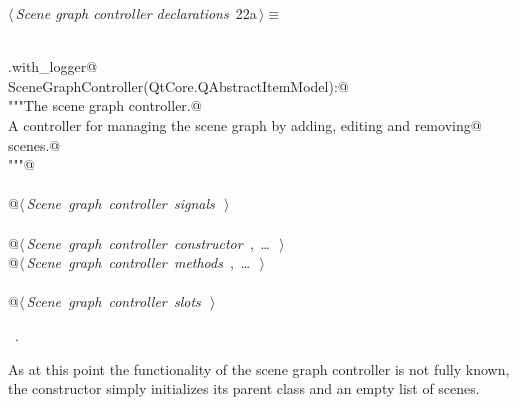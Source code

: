 \documentclass[
    a4paper,      %
    10pt,         %
    openright,    %
    notitlepage,  %
    parskip=half, %
]{scrreprt}       %
\theoremstyle{definition}                    %
\begin{document}
\begin{flushleft} \small
\begin{minipage}{\linewidth}\label{scrap16}\raggedright\small
{} $\langle\,${\itshape Scene graph controller declarations}\nobreak\ {\footnotesize {22a}}$\,\rangle\equiv$
\vspace{-1exm}
\begin{list}{}{} \item
\mbox{}\lstinline@@\\
\mbox{}\lstinline@common.with_logger@\\
\mbox{}\lstinline@class SceneGraphController(QtCore.QAbstractItemModel):@\\
\mbox{}\lstinline@    """The scene graph controller.@\\
\mbox{}\lstinline@    A controller for managing the scene graph by adding, editing and removing@\\
\mbox{}\lstinline@    scenes.@\\
\mbox{}\lstinline@    """@\\
\mbox{}\lstinline@@\\
\mbox{}\lstinline@    @\hbox{$\langle\,${\itshape Scene graph controller signals}\nobreak\ {\footnotesize {}}$\,\rangle$}\lstinline@@\\
\mbox{}\lstinline@@\\
\mbox{}\lstinline@    @\hbox{$\langle\,${\itshape Scene graph controller constructor}\nobreak\ {\footnotesize {}, \ldots\ }$\,\rangle$}\lstinline@@\\
\mbox{}\lstinline@    @\hbox{$\langle\,${\itshape Scene graph controller methods}\nobreak\ {\footnotesize {}, \ldots\ }$\,\rangle$}\lstinline@@\\
\mbox{}\lstinline@@\\
\mbox{}\lstinline@    @\hbox{$\langle\,${\itshape Scene graph controller slots}\nobreak\ {\footnotesize {}}$\,\rangle$}\lstinline@@\\
\mbox{}\lstinline@@{\NWsep}
\end{list}
\vspace{-1.5ex}
\footnotesize
\begin{list}{}{\setlength{\itemsep}{-\parsep}\setlength{\itemindent}{-\leftmargin}}
\item \NWtxtMacroRefIn\ .

\item{}
\end{list}
\end{minipage}\vspace{4ex}
\end{flushleft}
As at this point the functionality of the scene graph controller is not fully
known, the constructor simply initializes its parent class and an empty list of
scenes.
\end{document}
